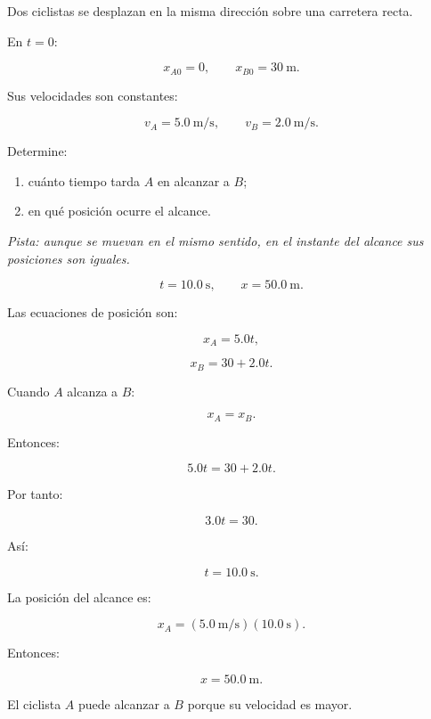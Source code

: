 \begin{ejercicio}
Dos ciclistas se desplazan en la misma dirección sobre una carretera recta.

En \(t=0\):

\[
x_{A0}=0,
\qquad
x_{B0}=\SI{30}{\meter}.
\]

Sus velocidades son constantes:

\[
v_A=\SI{5.0}{\meter\per\second},
\qquad
v_B=\SI{2.0}{\meter\per\second}.
\]

Determine:

\begin{enumerate}[label=\alph*)]
    \item cuánto tiempo tarda \(A\) en alcanzar a \(B\);
    \item en qué posición ocurre el alcance.
\end{enumerate}

\textit{Pista: aunque se muevan en el mismo sentido, en el instante del alcance sus posiciones son iguales.}
\end{ejercicio}

\begin{respuesta}
\[
\boxed{t=\SI{10.0}{\second}},
\qquad
\boxed{x=\SI{50.0}{\meter}}.
\]
\end{respuesta}

\begin{explicacion}
Las ecuaciones de posición son:

\[
x_A=5.0t,
\]

\[
x_B=30+2.0t.
\]

Cuando \(A\) alcanza a \(B\):

\[ x_A=x_B. \]

Entonces:

\[
5.0t=30+2.0t.
\]

Por tanto:

\[
3.0t=30.
\]

Así:

\[ \boxed{t=\SI{10.0}{\second}}. \]

La posición del alcance es:

\[
x_A
=
(\SI{5.0}{\meter\per\second})
(\SI{10.0}{\second}).
\]

Entonces:

\[ \boxed{x=\SI{50.0}{\meter}}. \]

El ciclista \(A\) puede alcanzar a \(B\) porque su velocidad es mayor.
\end{explicacion}


